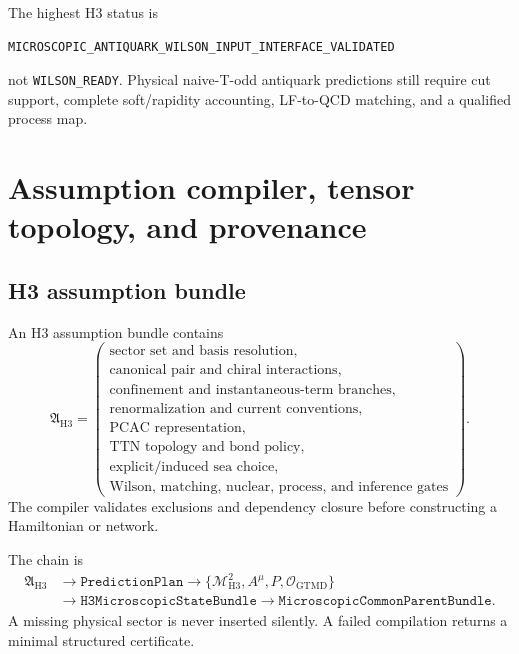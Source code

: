 \documentclass[11pt]{article}
\newcommand{\GTMD}{\ensuremath{\mathrm{GTMD}}}
\newcommand{\cO}{\mathcal O}
\newcommand{\cM}{\mathcal M}
\newcommand{\PredictionPlan}{\texttt{PredictionPlan}}
\newcommand{\StateBundle}{\texttt{H3MicroscopicStateBundle}}
\newcommand{\CommonParent}{\texttt{MicroscopicCommonParentBundle}}
\begin{document}
The highest H3 status is
\begin{verbatim}
MICROSCOPIC_ANTIQUARK_WILSON_INPUT_INTERFACE_VALIDATED
\end{verbatim}
not \texttt{WILSON\_READY}.  Physical naive-T-odd antiquark predictions still
require cut support, complete soft/rapidity accounting, LF-to-QCD matching,
and a qualified process map.

\section{Assumption compiler, tensor topology, and provenance}
\label{sec:compiler}

\subsection{H3 assumption bundle}

An H3 assumption bundle contains
\begin{equation}
 \mathfrak A_{\mathrm{H3}}
 =
 \left(
 \begin{array}{l}
 \text{sector set and basis resolution},\\
 \text{canonical pair and chiral interactions},\\
 \text{confinement and instantaneous-term branches},\\
 \text{renormalization and current conventions},\\
 \text{PCAC representation},\\
 \text{TTN topology and bond policy},\\
 \text{explicit/induced sea choice},\\
 \text{Wilson, matching, nuclear, process, and inference gates}
 \end{array}
 \right).
\end{equation}
The compiler validates exclusions and dependency closure before constructing
a Hamiltonian or network.

The chain is
\begin{equation}
\begin{aligned}
 \mathfrak A_{\mathrm{H3}}
 &\longrightarrow \PredictionPlan
 \longrightarrow
 \{\cM_{\mathrm{H3}}^2,A^{\mu},P,\cO_{\GTMD}\}
 \\
 &\longrightarrow \StateBundle
 \longrightarrow \CommonParent.
\end{aligned}
 \label{eq:compile-chain}
\end{equation}
A missing physical sector is never inserted silently.  A failed compilation
returns a minimal structured certificate.
\end{document}
